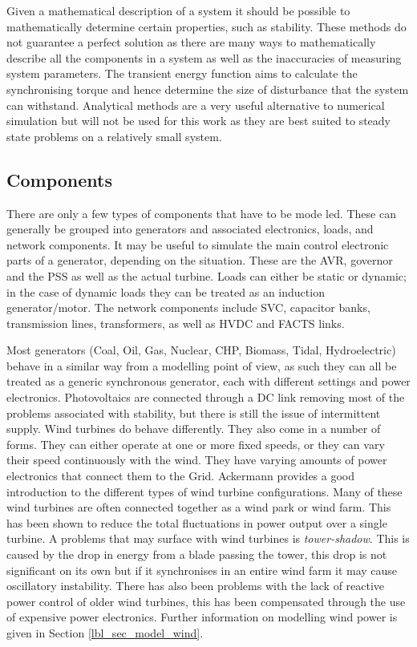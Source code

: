 \documentclass[a4paper,oneside,12pt]{report}
\begin{document}
Given a mathematical description of a system it should be possible to mathematically determine certain properties, such as stability. These methods do not guarantee a perfect solution as there are many ways to mathematically describe all the components in a system as well as the inaccuracies of measuring system parameters. The transient energy function \cite{Yong2007} aims to calculate the synchronising torque and hence determine the size of disturbance that the system can withstand. Analytical methods are a very useful alternative to numerical simulation but will not be used for this work as they are best suited to steady state problems on a relatively small system.

\subsection{Components}

There are only a few types of components that have to be mode led. These can generally be grouped into generators and associated electronics, loads, and network components. It may be useful to simulate the main control electronic parts of a generator, depending on the situation. These are the AVR, governor and the PSS as well as the actual turbine. Loads can either be static or dynamic; in the case of dynamic loads they can be treated as an induction generator/motor. The network components include SVC, capacitor banks, transmission lines, transformers, as well as HVDC and FACTS links.

Most generators (Coal, Oil, Gas, Nuclear, CHP, Biomass, Tidal, Hydroelectric) behave in a similar way from a modelling point of view, as such they can all be treated as a generic synchronous generator, each with different settings and power electronics. Photovoltaics are connected through a DC link removing most of the problems associated with stability, but there is still the issue of intermittent supply. Wind turbines do behave differently. They also come in a number of forms. They can either operate at one or more fixed speeds, or they can vary their speed continuously with the wind. They have varying amounts of power electronics that connect them to the Grid. Ackermann \cite{Ackermann2005} provides a good introduction to the different types of wind turbine configurations. Many of these wind turbines are often connected together as a wind park or wind farm. This has been shown to reduce the total fluctuations in power output over a single turbine. A problems that may surface with wind turbines is \emph{tower-shadow}.  This is caused by the drop in energy from a blade passing the tower, this drop is not significant on its own but if it synchronises in an entire wind farm it may cause oscillatory instability. There has also been problems with the lack of reactive power control of older wind turbines, this has been compensated through the use of expensive power electronics. Further information on modelling wind power is given in Section \ref{lbl_sec_model_wind}.
\end{document}
